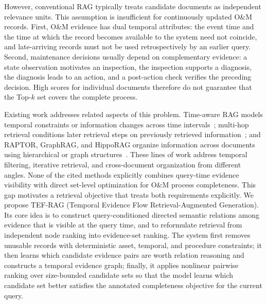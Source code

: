 %
However, conventional RAG typically treats candidate documents as independent relevance units. This assumption is insufficient for continuously updated O\&M records. First, O\&M evidence has dual temporal attributes: the event time and the time at which the record becomes available to the system need not coincide, and late-arriving records must not be used retrospectively by an earlier query. Second, maintenance decisions usually depend on complementary evidence: a state observation motivates an inspection, the inspection supports a diagnosis, the diagnosis leads to an action, and a post-action check verifies the preceding decision. High scores for individual documents therefore do not guarantee that the Top-$k$ set covers the complete process.

Existing work addresses related aspects of this problem. Time-aware RAG models temporal constraints or information changes across time intervals~\cite{zhang2025mrag,lau2025tarag}; multi-hop retrieval conditions later retrieval steps on previously retrieved information~\cite{xiong2021mdr,trivedi2023ircot}; and RAPTOR, GraphRAG, and HippoRAG organize information across documents using hierarchical or graph structures~\cite{sarthi2024raptor,edge2024graphrag,gutierrez2024hipporag}. These lines of work address temporal filtering, iterative retrieval, and cross-document organization from different angles.
None of the cited methods explicitly combines query-time evidence visibility with direct set-level optimization for O\&M process completeness. This gap motivates a retrieval objective that treats both requirements explicitly.
We propose TEF-RAG (Temporal Evidence Flow Retrieval-Augmented Generation). Its core idea is to construct query-conditioned directed semantic relations among evidence that is visible at the query time, and to reformulate retrieval from independent node ranking into evidence-set ranking. The system first removes unusable records with deterministic asset, temporal, and procedure constraints; it then learns which candidate evidence pairs are worth relation reasoning and constructs a temporal evidence graph; finally, it applies nonlinear pairwise ranking over size-bounded candidate sets so that the model learns which candidate set better satisfies the annotated completeness objective for the current query.

